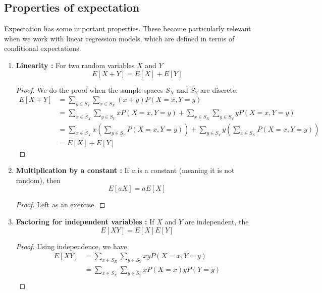   \subsection{Properties of expectation}\label{prop:lin} 
  
Expectation has some important properties. These become particularly relevant when we work with linear regression models, which are defined in terms of conditional expectations. 
  \begin{enumerate}
  \item {\bf Linearity  \cite[Theorem 3.1.2]{evans}:} For two random variables $X$ and $Y$   \begin{equation*}
  E[X+Y] = E[X]+E[Y]
  \end{equation*}
  \begin{proof} We do the proof when the sample spaces $S_X$ and $S_Y$ are discrete: 
  \begin{align*}
  E[X+Y] &= \sum_{y \in S_Y}\sum_{x\in S_X} (x+y)P(X=x,Y=y) \\
  &= \sum_{x \in S_X} \sum_{y \in S_Y} xP(X=x,Y=y)  +  \sum_{x \in S_X} \sum_{y \in S_Y} yP(X=x,Y=y) \\
  &= \sum_{x \in S_X} x\left( \sum_{y \in S_Y}P(X=x,Y=y)  \right)+   \sum_{y \in S_Y} y\left( \sum_{x \in S_X} P(X=x,Y=y)\right) \\
  &= E[X] + E[Y]
  \end{align*}
  \end{proof}
    \item {\bf Multiplication by a constant \cite[Theorem 3.1.2]{evans}:} If $a$ is a constant (meaning it is not random), then 
    \begin{equation*}
      E[aX] =  a E[X]
    \end{equation*}
     \begin{proof}  Left as an exercise. 
     \end{proof}
  \item \label{prop:ind}  {\bf Factoring for independent variables \cite[Theorem 3.1.3]{evans}:} If $X$ and $Y$ are independent, the 
  \begin{equation*}
  E[XY]=E[X]E[Y]
  \end{equation*}
    \begin{proof} Using independence, we have 
    \begin{align*}
     E[XY] &= \sum_{x \in S_X}\sum_{y \in S_Y} xy P(X=x,Y=y)  \\
     &= \sum_{x \in S_X}\sum_{y \in S_Y} xP(X=x)yP(Y=y) \\

\end{align*}
\end{proof}
\end{enumerate}
